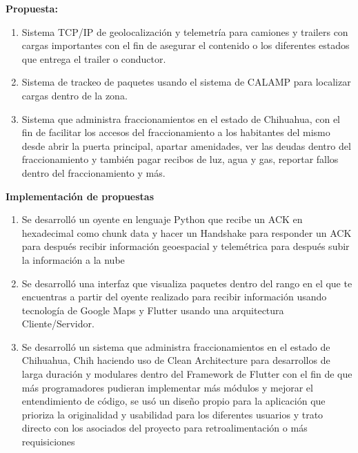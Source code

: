 \documentclass[protocolo.tex]{subfiles}
\begin{document}
\textbf{Propuesta:}
\begin{enumerate}
\item Sistema TCP/IP de geolocalización y telemetría para camiones y trailers con cargas
importantes con el fin de asegurar el contenido o los diferentes estados que entrega el trailer
o conductor.
\item Sistema de trackeo de paquetes usando el sistema de CALAMP para localizar cargas
dentro de la zona.
\item Sistema que administra fraccionamientos en el estado de Chihuahua, con el fin de
facilitar los accesos del fraccionamiento a los habitantes del mismo desde abrir la puerta
principal, apartar amenidades, ver las deudas dentro del fraccionamiento y también pagar
recibos de luz, agua y gas, reportar fallos dentro del fraccionamiento y más.

\end{enumerate}

\textbf{Implementación de propuestas}
\begin{enumerate}
\item Se desarrolló un oyente en lenguaje Python que recibe un ACK en hexadecimal como
chunk data y hacer un Handshake para responder un ACK para después recibir información
geoespacial y telemétrica para después subir la información a la nube

\item Se desarrolló una interfaz que visualiza paquetes dentro del rango en el que te
encuentras a partir del oyente realizado para recibir información usando tecnología de
Google Maps y Flutter usando una arquitectura Cliente/Servidor.

\item Se desarrolló un sistema que administra fraccionamientos en el estado de Chihuahua,
Chih haciendo uso de Clean Architecture para desarrollos de larga duración y modulares
dentro del Framework de Flutter con el fin de que más programadores pudieran
implementar más módulos y mejorar el entendimiento de código, se usó un diseño propio
para la aplicación que prioriza la originalidad y usabilidad para los diferentes usuarios y
trato directo con los asociados del proyecto para retroalimentación o más requisiciones
\end{enumerate}
\end{document}
